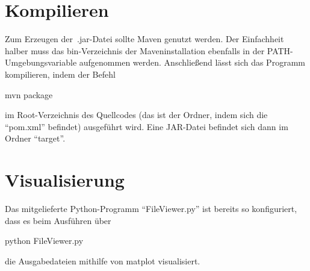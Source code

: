 \section{Kompilieren}\label{sec:kompilieren}
Zum Erzeugen der~.jar-Datei sollte Maven genutzt werden.
Der Einfachheit halber muss das bin-Verzeichnis der Maveninstallation ebenfalls in der PATH-Umgebungsvariable aufgenommen werden.
Anschließend lässt sich das Programm kompilieren, indem der Befehl
\begin{center}
    \colorbox{gray!20}{
        \begin{minipage}{0.9\textwidth}
            mvn package
        \end{minipage}
    }
\end{center}
im Root-Verzeichnis des Quellcodes (das ist der Ordner, indem sich die \enquote{pom.xml} befindet) ausgeführt wird.
Eine JAR-Datei befindet sich dann im Ordner \enquote{target}.

\section{Visualisierung}\label{sec:visualisierung}
Das mitgelieferte Python-Programm \enquote{FileViewer.py} ist bereits so konfiguriert, dass es beim Ausführen über
\begin{center}
    \colorbox{gray!20}{
        \begin{minipage}{0.9\textwidth}
            python FileViewer.py
        \end{minipage}
    }
\end{center}
die Ausgabedateien mithilfe von matplot visualisiert.